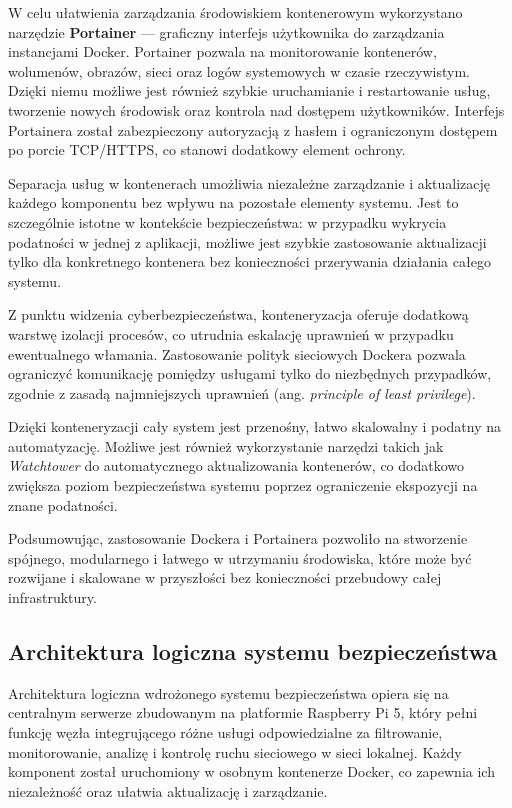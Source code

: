 \documentclass[
    left=2.5cm,         %
    right=2.5cm,        %
    top=2.5cm,          %
    bottom=3cm,         %
    bindingoffset=6mm,  %
    nohyphenation=true %
]{eiti/eiti-thesis} %
\begin{document}
W celu ułatwienia zarządzania środowiskiem kontenerowym wykorzystano narzędzie \textbf{Portainer} — graficzny interfejs użytkownika do zarządzania instancjami Docker. Portainer pozwala na monitorowanie kontenerów, wolumenów, obrazów, sieci oraz logów systemowych w czasie rzeczywistym. Dzięki niemu możliwe jest również szybkie uruchamianie i restartowanie usług, tworzenie nowych środowisk oraz kontrola nad dostępem użytkowników. Interfejs Portainera został zabezpieczony autoryzacją z hasłem i ograniczonym dostępem po porcie TCP/HTTPS, co stanowi dodatkowy element ochrony.

Separacja usług w kontenerach umożliwia niezależne zarządzanie i aktualizację każdego komponentu bez wpływu na pozostałe elementy systemu. Jest to szczególnie istotne w kontekście bezpieczeństwa: w przypadku wykrycia podatności w jednej z aplikacji, możliwe jest szybkie zastosowanie aktualizacji tylko dla konkretnego kontenera bez konieczności przerywania działania całego systemu.

Z punktu widzenia cyberbezpieczeństwa, konteneryzacja oferuje dodatkową warstwę izolacji procesów, co utrudnia eskalację uprawnień w przypadku ewentualnego włamania. Zastosowanie polityk sieciowych Dockera pozwala ograniczyć komunikację pomiędzy usługami tylko do niezbędnych przypadków, zgodnie z zasadą najmniejszych uprawnień (ang. \textit{principle of least privilege}).

Dzięki konteneryzacji cały system jest przenośny, łatwo skalowalny i podatny na automatyzację. Możliwe jest również wykorzystanie narzędzi takich jak \textit{Watchtower} do automatycznego aktualizowania kontenerów, co dodatkowo zwiększa poziom bezpieczeństwa systemu poprzez ograniczenie ekspozycji na znane podatności.

Podsumowując, zastosowanie Dockera i Portainera pozwoliło na stworzenie spójnego, modularnego i łatwego w utrzymaniu środowiska, które może być rozwijane i skalowane w przyszłości bez konieczności przebudowy całej infrastruktury.

\subsection{Architektura logiczna systemu bezpieczeństwa}
Architektura logiczna wdrożonego systemu bezpieczeństwa opiera się na centralnym serwerze zbudowanym na platformie Raspberry Pi 5, który pełni funkcję węzła integrującego różne usługi odpowiedzialne za filtrowanie, monitorowanie, analizę i kontrolę ruchu sieciowego w sieci lokalnej. Każdy komponent został uruchomiony w osobnym kontenerze Docker, co zapewnia ich niezależność oraz ułatwia aktualizację i zarządzanie.
\end{document}

